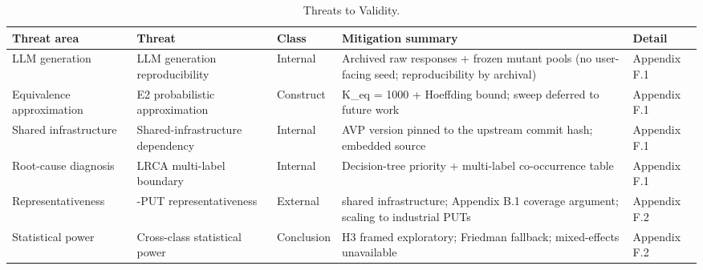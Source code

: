 \documentclass[manuscript,screen,review]{acmart}
\begin{document}
{%
\begin{longtable}[]{@{}
  >{\raggedright\arraybackslash}p{}
  >{\raggedright\arraybackslash}p{}
  >{\raggedright\arraybackslash}p{}
  >{\raggedright\arraybackslash}p{}
  >{\raggedright\arraybackslash}p{}@{}}
\caption{Threats to Validity.}\label{tab:p2-14}\\
\toprule\noalign{}
\begin{minipage}[b]{\linewidth}\raggedright
Threat area
\end{minipage} & \begin{minipage}[b]{\linewidth}\raggedright
Threat
\end{minipage} & \begin{minipage}[b]{\linewidth}\raggedright
Class
\end{minipage} & \begin{minipage}[b]{\linewidth}\raggedright
Mitigation summary
\end{minipage} & \begin{minipage}[b]{\linewidth}\raggedright
Detail
\end{minipage} \\
\midrule\noalign{}
\endfirsthead
\endhead
\bottomrule\noalign{}
\endlastfoot
LLM generation & LLM generation reproducibility & Internal & Archived raw responses
+ frozen mutant pools (no user-facing seed; reproducibility by archival) & Appendix F.1 \\
Equivalence approximation & E2 probabilistic approximation & Construct & K\_eq = 1000 +
Hoeffding bound; sweep deferred to future work & Appendix F.1 \\
Shared infrastructure & Shared-infrastructure dependency & Internal & AVP version pinned to the upstream
commit hash; embedded source & Appendix F.1 \\
Root-cause diagnosis & LRCA multi-label boundary & Internal & Decision-tree priority +
multi-label co-occurrence table & Appendix F.1 \\
Representativeness & 12-PUT representativeness & External & shared infrastructure; Appendix B.1
coverage argument; scaling to industrial PUTs & Appendix F.2 \\
Statistical power & Cross-class statistical power & Conclusion & H3 framed exploratory;
Friedman fallback; mixed-effects unavailable & Appendix F.2 \\

\end{longtable}}
\end{document}

